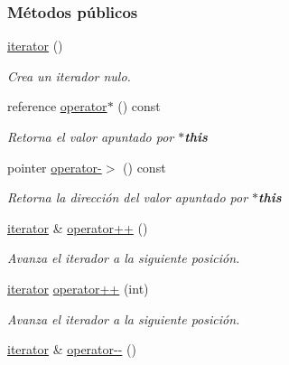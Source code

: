 \subsubsection*{\-Métodos públicos}
\begin{DoxyCompactItemize}
\item 
\hyperlink{classaed2_1_1iterator_1_1iterator_ae488782067dfba96b447080b0db1ed2c_ae488782067dfba96b447080b0db1ed2c}{iterator} ()
\begin{DoxyCompactList}\small\item\em \-Crea un iterador nulo. \end{DoxyCompactList}\item 
reference \hyperlink{classaed2_1_1iterator_1_1iterator_abc83982866d43a19f4b43e7ea7660402_abc83982866d43a19f4b43e7ea7660402}{operator$\ast$} () const 
\begin{DoxyCompactList}\small\item\em \-Retorna el valor apuntado por {\bfseries $\ast$this} \end{DoxyCompactList}\item 
pointer \hyperlink{classaed2_1_1iterator_1_1iterator_a4d20575249803ebf2604c1e58debc5cf_a4d20575249803ebf2604c1e58debc5cf}{operator-\/$>$} () const 
\begin{DoxyCompactList}\small\item\em \-Retorna la dirección del valor apuntado por {\bfseries $\ast$this} \end{DoxyCompactList}\item 
\hyperlink{classaed2_1_1iterator_1_1iterator}{iterator} \& \hyperlink{classaed2_1_1iterator_1_1iterator_a457fdf0ed06c88121b441424f1c99f4f_a457fdf0ed06c88121b441424f1c99f4f}{operator++} ()
\begin{DoxyCompactList}\small\item\em \-Avanza el iterador a la siguiente posición. \end{DoxyCompactList}\item 
\hyperlink{classaed2_1_1iterator_1_1iterator}{iterator} \hyperlink{classaed2_1_1iterator_1_1iterator_aa2023454f3ce45f7da4ef23d7a7f6749_aa2023454f3ce45f7da4ef23d7a7f6749}{operator++} (int)
\begin{DoxyCompactList}\small\item\em \-Avanza el iterador a la siguiente posición. \end{DoxyCompactList}\item 
\hyperlink{classaed2_1_1iterator_1_1iterator}{iterator} \& \hyperlink{classaed2_1_1iterator_1_1iterator_a260692ee1d51f87ef547b4a798fc2de5_a260692ee1d51f87ef547b4a798fc2de5}{operator-\/-\/} ()

\end{DoxyCompactItemize}
